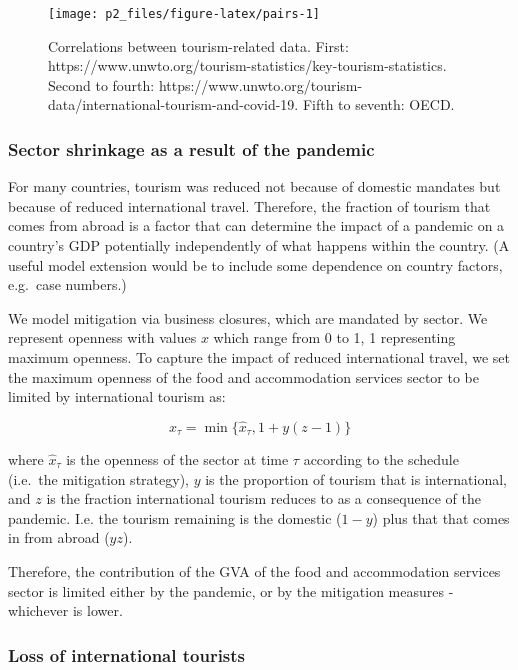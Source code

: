 \documentclass[
]{article}
\begin{document}
\begin{figure}

{\centering \texttt{[image: p2\_files/figure-latex/pairs-1]} 

}

\caption{Correlations between tourism-related data. First: https://www.unwto.org/tourism-statistics/key-tourism-statistics. Second to fourth: https://www.unwto.org/tourism-data/international-tourism-and-covid-19. Fifth to seventh: OECD.}\label{fig:pairs}
\end{figure}

\newpage

\hypertarget{sector-shrinkage-as-a-result-of-the-pandemic}{%
\subsubsection{Sector shrinkage as a result of the pandemic}\label{sector-shrinkage-as-a-result-of-the-pandemic}}

For many countries, tourism was reduced not because of domestic mandates but because of reduced international travel. Therefore, the fraction of tourism that comes from abroad is a factor that can determine the impact of a pandemic on a country's GDP potentially independently of what happens within the country. (A useful model extension would be to include some dependence on country factors, e.g.~case numbers.)

We model mitigation via business closures, which are mandated by sector. We represent openness with values \(x\) which range from 0 to 1, 1 representing maximum openness. To capture the impact of reduced international travel, we set the maximum openness of the food and accommodation services sector to be limited by international tourism as:

\[x_\tau = \min\{\hat{x}_\tau, 1+ y(z-1)\}\]

where \(\hat{x}_\tau\) is the openness of the sector at time \(\tau\) according to the schedule (i.e.~the mitigation strategy), \(y\) is the proportion of tourism that is international, and \(z\) is the fraction international tourism reduces to as a consequence of the pandemic. I.e. the tourism remaining is the domestic (\(1-y\)) plus that that comes in from abroad (\(yz\)).

Therefore, the contribution of the GVA of the food and accommodation services sector is limited either by the pandemic, or by the mitigation measures - whichever is lower.

\hypertarget{loss-of-international-tourists}{%
\subsubsection{Loss of international tourists}\label{loss-of-international-tourists}}
\end{document}
